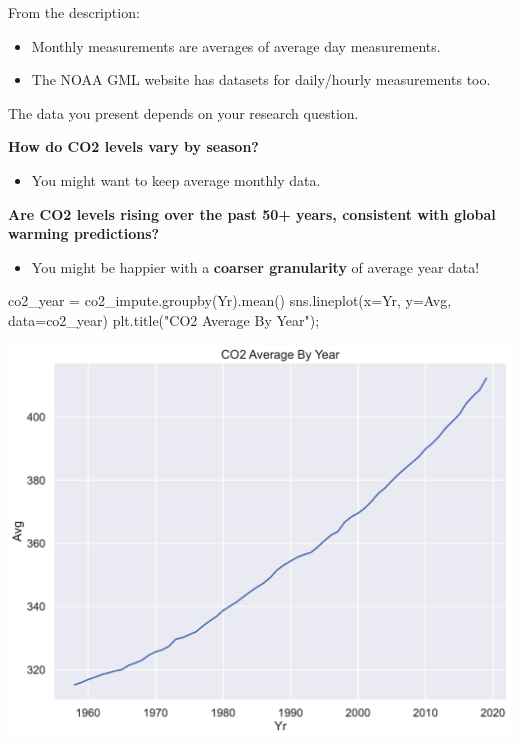 \documentclass[
  letterpaper,
  DIV=11,
  numbers=noendperiod]{scrreprt}
\newenvironment{Shaded}{\begin{snugshade}}{\end{snugshade}}
\newcommand{\NormalTok}[1]{\textcolor[rgb]{0.00,0.23,0.31}{#1}}
\newcommand{\OperatorTok}[1]{\textcolor[rgb]{0.37,0.37,0.37}{#1}}
\newcommand{\StringTok}[1]{\textcolor[rgb]{0.13,0.47,0.30}{#1}}
\providecommand{\tightlist}{%
  \setlength{\itemsep}{0pt}\setlength{\parskip}{0pt}}\usepackage{longtable,booktabs,array}
\begin{document}
From the description:

\begin{itemize}
\tightlist
\item
  Monthly measurements are averages of average day measurements.
\item
  The NOAA GML website has datasets for daily/hourly measurements too.
\end{itemize}

The data you present depends on your research question.

\textbf{How do CO2 levels vary by season?}

\begin{itemize}
\tightlist
\item
  You might want to keep average monthly data.
\end{itemize}

\textbf{Are CO2 levels rising over the past 50+ years, consistent with
global warming predictions?}

\begin{itemize}
\tightlist
\item
  You might be happier with a \textbf{coarser granularity} of average
  year data!
\end{itemize}

\begin{Shaded}
\begin{Highlighting}[]
\NormalTok{co2\_year }\OperatorTok{=}\NormalTok{ co2\_impute.groupby(}\StringTok{\textquotesingle{}Yr\textquotesingle{}}\NormalTok{).mean()}
\NormalTok{sns.lineplot(x}\OperatorTok{=}\StringTok{\textquotesingle{}Yr\textquotesingle{}}\NormalTok{, y}\OperatorTok{=}\StringTok{\textquotesingle{}Avg\textquotesingle{}}\NormalTok{, data}\OperatorTok{=}\NormalTok{co2\_year)}
\NormalTok{plt.title(}\StringTok{"CO2 Average By Year"}\NormalTok{)}\OperatorTok{;}
\end{Highlighting}
\end{Shaded}

\includegraphics{eda/eda_files/figure-pdf/cell-77-output-1.pdf}
\end{document}
